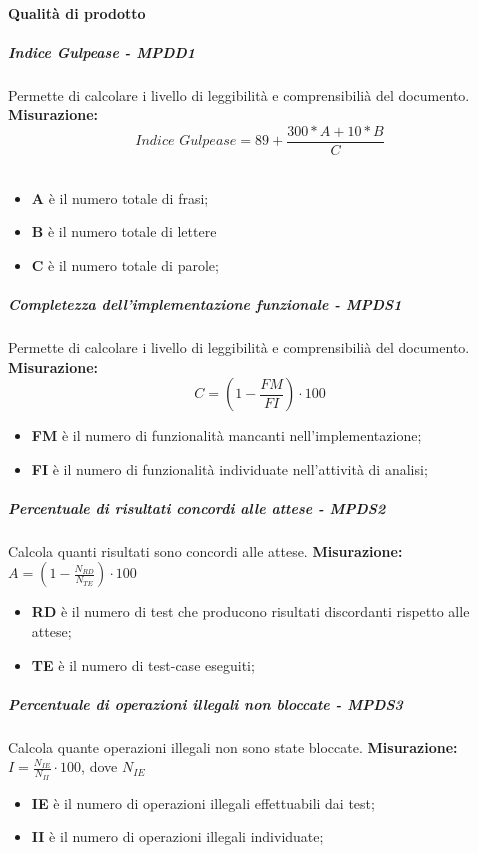 \paragraph{Qualità di prodotto}
\subparagraph{Indice Gulpease - MPDD1}
Permette di calcolare i livello di leggibilità e comprensibilià del documento.
\textbf{Misurazione:}
\begin{equation}\textit{Indice Gulpease} = 89 + \frac{300 * \textit{A} + 10 * B}{C} 
\end{equation} \\
\begin{itemize}
	\item \textbf{A} è il numero totale di frasi;
	\item \textbf{B} è il numero totale di lettere
	\item \textbf{C} è il numero totale di parole;
\end{itemize}
\subparagraph{Completezza dell’implementazione funzionale - MPDS1}
Permette di calcolare i livello di leggibilità e comprensibilià del documento.
\textbf{Misurazione:}
\begin{equation}
C=(1-\frac{FM}{FI})\cdot 100
\end{equation}
\begin{itemize}
	\item \textbf{FM} è il numero di funzionalità mancanti nell'implementazione;
	\item \textbf{FI} è il numero di funzionalità individuate nell'attività di analisi;
\end{itemize}
\subparagraph{Percentuale di risultati concordi alle attese - MPDS2}
Calcola quanti risultati sono concordi alle attese.
\textbf{Misurazione:}
$A=(1-\frac{N_{RD}}{N_{TE}}) \cdot 100$
\begin{itemize}
	\item \textbf{RD} è il numero di test che producono risultati discordanti rispetto alle attese;
	\item \textbf{TE}  è il numero di test-case eseguiti;
\end{itemize}
\subparagraph{Percentuale di operazioni illegali non bloccate - MPDS3}
Calcola quante operazioni illegali non sono state bloccate.
\textbf{Misurazione:}
$I=\frac{N_{IE}}{N_{II}} \cdot 100$, dove $N_{IE}$
\begin{itemize}
	\item \textbf{IE} è il numero di operazioni illegali effettuabili dai test;
	\item \textbf{II} è il numero di operazioni illegali individuate;
\end{itemize}
